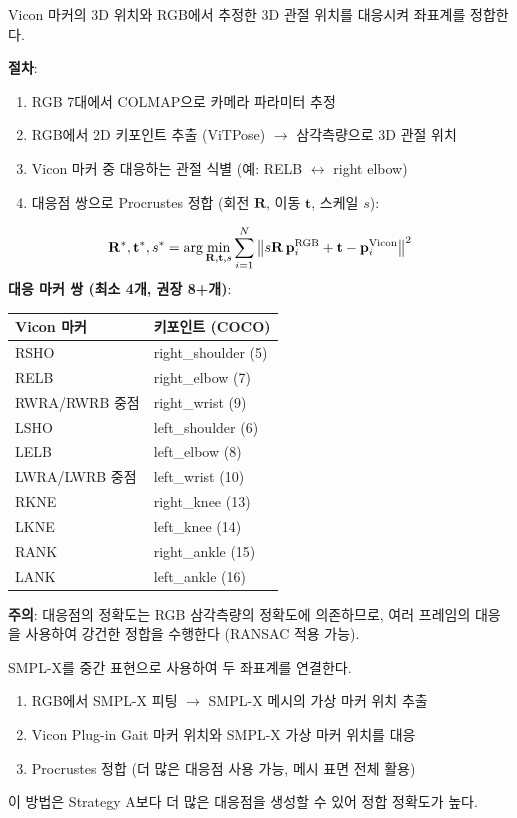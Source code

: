 \documentclass[11pt, a4paper]{report}
\begin{document}
\begin{solutionbox}[title={Strategy A: 마커 위치 기반 3D-3D 정합}]
Vicon 마커의 3D 위치와 RGB에서 추정한 3D 관절 위치를 대응시켜 좌표계를 정합한다.

\textbf{절차}:
\begin{enumerate}[nosep]
  \item RGB 7대에서 COLMAP으로 카메라 파라미터 추정
  \item RGB에서 2D 키포인트 추출 (ViTPose) $\rightarrow$ 삼각측량으로 3D 관절 위치
  \item Vicon 마커 중 대응하는 관절 식별 (예: RELB $\leftrightarrow$ right elbow)
  \item 대응점 쌍으로 Procrustes 정합 (회전 $\mathbf{R}$, 이동 $\mathbf{t}$, 스케일 $s$):
\end{enumerate}
\begin{equation}
  \mathbf{R}^*, \mathbf{t}^*, s^* = \arg\min_{\mathbf{R}, \mathbf{t}, s}
  \sum_{i=1}^{N} \left\| s\mathbf{R}\,\mathbf{p}_i^{\text{RGB}} + \mathbf{t} - \mathbf{p}_i^{\text{Vicon}} \right\|^2
\end{equation}
\textbf{대응 마커 쌍 (최소 4개, 권장 8+개)}:
\begin{center}
\small
\begin{tabular}{ll}
\toprule
\textbf{Vicon 마커} & \textbf{키포인트 (COCO)} \\
\midrule
RSHO & right\_shoulder (5) \\
RELB & right\_elbow (7) \\
RWRA/RWRB 중점 & right\_wrist (9) \\
LSHO & left\_shoulder (6) \\
LELB & left\_elbow (8) \\
LWRA/LWRB 중점 & left\_wrist (10) \\
RKNE & right\_knee (13) \\
LKNE & left\_knee (14) \\
RANK & right\_ankle (15) \\
LANK & left\_ankle (16) \\
\bottomrule
\end{tabular}
\end{center}

\textbf{주의}: 대응점의 정확도는 RGB 삼각측량의 정확도에 의존하므로,
여러 프레임의 대응을 사용하여 강건한 정합을 수행한다 (RANSAC 적용 가능).
\end{solutionbox}

\begin{solutionbox}[title={Strategy B: SMPL-X 매개 정합 (더 정확)}]
SMPL-X를 중간 표현으로 사용하여 두 좌표계를 연결한다.

\begin{enumerate}[nosep]
  \item RGB에서 SMPL-X 피팅 $\rightarrow$ SMPL-X 메시의 가상 마커 위치 추출
  \item Vicon Plug-in Gait 마커 위치와 SMPL-X 가상 마커 위치를 대응
  \item Procrustes 정합 (더 많은 대응점 사용 가능, 메시 표면 전체 활용)
\end{enumerate}
이 방법은 Strategy A보다 더 많은 대응점을 생성할 수 있어 정합 정확도가 높다.
\end{solutionbox}
\end{document}
